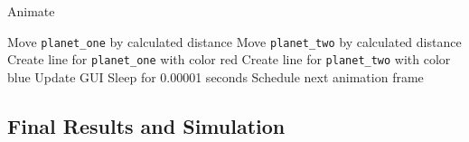 \documentclass{article}
\begin{document}
\begin{algorithm}
\caption{Animate}
\begin{algorithmic}[1]
        \State Move \texttt{planet\_one} by calculated distance
        \State Move \texttt{planet\_two} by calculated distance
        \State Create line for \texttt{planet\_one} with color red
        \State Create line for \texttt{planet\_two} with color blue
        \State Update GUI
        \State Sleep for 0.00001 seconds
        \State Schedule next animation frame
    \EndIf
\EndFunction
\end{algorithmic}
\end{algorithm}
\clearpage
\vspace*{\fill}
\begin{center}
    \subsection*{\huge Final Results and Simulation}
\end{center}
\vspace*{\fill}
\end{document}
